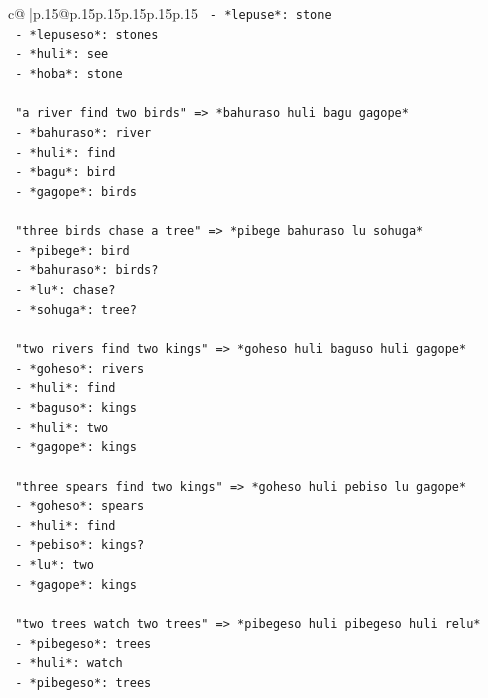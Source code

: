 \documentclass{article}
\begin{document}
{\begin{supertabular}{c@{$\;$}|p{.15\linewidth}@{}p{.15\linewidth}p{.15\linewidth}p{.15\linewidth}p{.15\linewidth}p{.15\linewidth}}
{{{\texttt{   {-} *lepuse*: stone} \\
\texttt{   {-} *lepuseso*: stones} \\
\texttt{   {-} *huli*: see} \\
\texttt{   {-} *hoba*: stone} \\
\\ 
\texttt{   "a river find two birds" => *bahuraso huli bagu gagope*} \\
\texttt{   {-} *bahuraso*: river} \\
\texttt{   {-} *huli*: find} \\
\texttt{   {-} *bagu*: bird} \\
\texttt{   {-} *gagope*: birds} \\
\\ 
\texttt{   "three birds chase a tree" => *pibege bahuraso lu sohuga*} \\
\texttt{   {-} *pibege*: bird} \\
\texttt{   {-} *bahuraso*: birds?} \\
\texttt{   {-} *lu*: chase?} \\
\texttt{   {-} *sohuga*: tree?} \\
\\ 
\texttt{   "two rivers find two kings" => *goheso huli baguso huli gagope*} \\
\texttt{   {-} *goheso*: rivers} \\
\texttt{   {-} *huli*: find} \\
\texttt{   {-} *baguso*: kings} \\
\texttt{   {-} *huli*: two} \\
\texttt{   {-} *gagope*: kings} \\
\\ 
\texttt{   "three spears find two kings" => *goheso huli pebiso lu gagope*} \\
\texttt{   {-} *goheso*: spears} \\
\texttt{   {-} *huli*: find} \\
\texttt{   {-} *pebiso*: kings?} \\
\texttt{   {-} *lu*: two} \\
\texttt{   {-} *gagope*: kings} \\
\\ 
\texttt{   "two trees watch two trees" => *pibegeso huli pibegeso huli relu*} \\
\texttt{   {-} *pibegeso*: trees} \\
\texttt{   {-} *huli*: watch} \\
\texttt{   {-} *pibegeso*: trees} \\
}}}
\end{supertabular}}
\end{document}
